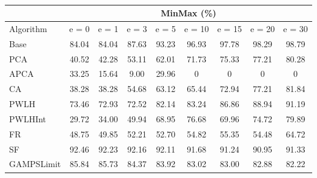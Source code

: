 \begin{table}[h]
\newcommand{\cpca}{\cellcolor{cyan!20}}
\newcommand{\capca}{\cellcolor{green!20}}
\newcommand{\cfr}{\cellcolor{yellow!25}}
\newcommand{\cgzip}{\cellcolor{orange!20}}
\newcommand{\best}{\cellcolor{violet!20}}
\centering\hspace*{-2.1cm}\begin{tabular}{| l | c | c | c | c | c | c | c | c |}\cline{2-9}\multicolumn{1}{c|}{}& \multicolumn{8}{c|}{MinMax (\%)}\\\hline
{Algorithm} & {e = 0} & {e = 1} & {e = 3} & {e = 5} & {e = 10} & {e = 15} & {e = 20} & {e = 30} \\\hline
{ Base} & {84.04} & {84.04} & {87.63} & {93.23} & {96.93} & {97.78} & {98.29} & {98.79} \\\hline
{\cpca PCA} & {40.52} & {42.28} & {53.11} & {62.01} & {71.73} & {75.33} & {77.21} & {80.28} \\\hline
{\capca APCA} & {33.25} & {\best15.64} & {\best9.00} & {\best29.96} & {\best0} & {\best0} & {\best0} & {\best0} \\\hline
{ CA} & {38.28} & {38.28} & {54.68} & {63.12} & {65.44} & {72.94} & {77.21} & {81.84} \\\hline
{ PWLH} & {73.46} & {72.93} & {72.52} & {82.14} & {83.24} & {86.86} & {88.94} & {91.19} \\\hline
{ PWLHInt} & {\best29.72} & {34.00} & {49.94} & {68.95} & {76.68} & {69.96} & {74.72} & {79.89} \\\hline
{\cfr FR} & {48.75} & {49.85} & {52.21} & {52.70} & {54.82} & {55.35} & {54.48} & {64.72} \\\hline
{ SF} & {92.46} & {92.23} & {92.16} & {92.11} & {91.68} & {91.24} & {90.95} & {91.33} \\\hline
{ GAMPSLimit} & {85.84} & {85.73} & {84.37} & {83.92} & {83.02} & {83.00} & {82.88} & {82.22} \\\hline
\end{tabular}
\caption{\captionminmax}
\label{experiments:minmax}
\end{table}
